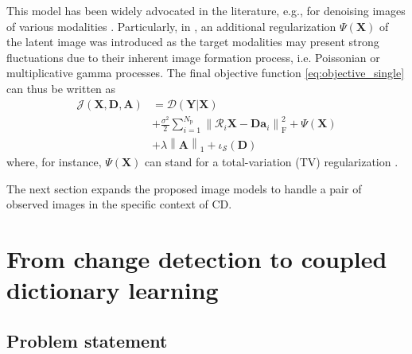 \documentclass[review]{elsarticle}
\newcommand{\Npatch}{N_{\mathrm{p}}}
\begin{document}
This model has been widely advocated in the literature, e.g., for denoising images of various modalities \citep{elad_image_2006,ma_dictionary_2013}. Particularly, in \citet{ma_dictionary_2013}, an additional regularization $\Psi\left(\mathbf{X}\right)$ of the latent image was introduced as the target modalities may present strong fluctuations due to their inherent image formation process, i.e. Poissonian or multiplicative gamma processes. The final objective function \eqref{eq:objective_single} can thus be written as
%
\begin{equation}
	\label{eq:objective_single_den}
	\begin{aligned}
  \mathcal{J}\left(\mathbf{X},\mathbf{D},\mathbf{A}\right) &=
  \mathcal{D}(\mathbf{Y}|\mathbf{X}) \\
  & + \frac{\sigma^{2}}{2}\sum_{i=1}^{\Npatch}\left\|\mathcal{R}_{{i}}\mathbf{X} - \mathbf{D}\mathbf{a}_{i}\right\|_{\mathrm{F}}^{2} + \Psi\left(\mathbf{X}\right) \\
  &+ \lambda \left\|\mathbf{A}\right\|_1 + \iota_{\mathcal{S}}(\mathbf{D})
	\end{aligned}
\end{equation}
%
where, for instance, $\Psi\left(\mathbf{X}\right)$ can stand for a total-variation (TV) regularization \citep{ma_dictionary_2013}.

The next section expands the proposed image models to handle a pair of observed images in the specific context of CD.

\section{From change detection to coupled dictionary learning}
\label{sec:DL}

\subsection{Problem statement}
\label{subsec:ps}
\end{document}
